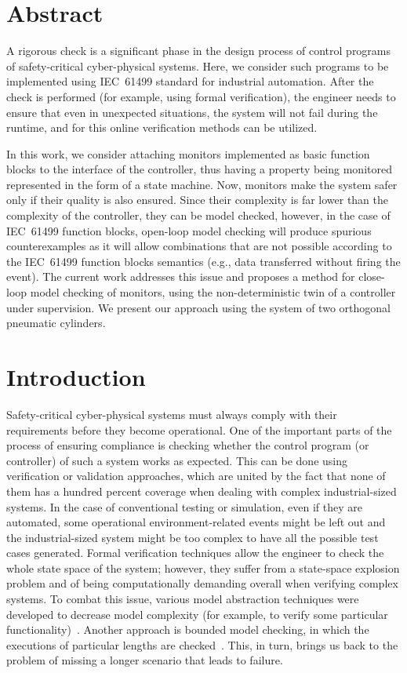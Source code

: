 \begin{bibunit}
\thispagestyle{plain}

\section*{Abstract}
A rigorous check is a significant phase in the design process of control programs of safety-critical cyber-physical systems. Here, we consider such programs to be implemented using IEC~61499 standard for industrial automation. After the check is performed (for example, using formal verification), the engineer needs to ensure that even in unexpected situations, the system will not fail during the runtime, and for this online verification methods can be utilized.

In this work, we consider attaching monitors implemented as basic function blocks to the interface of the controller, thus having a property being monitored represented in the form of a state machine. Now, monitors make the system safer only if their quality is also ensured. Since their complexity is far lower than the complexity of the controller, they can be model checked, however, in the case of IEC~61499 function blocks, open-loop model checking will produce spurious counterexamples as it will allow combinations that are not possible according to the IEC~61499 function blocks semantics (e.g., data transferred without firing the event). The current work addresses this issue and proposes a method for close-loop model checking of monitors, using the non-deterministic twin of a controller under supervision. We present our approach using the system of two orthogonal pneumatic cylinders.

\section{Introduction}
Safety-critical cyber-physical systems must always comply with their requirements before they become operational. One of the important parts of the process of ensuring compliance is checking whether the control program (or controller) of such a system works as expected. This can be done using verification or validation approaches, which are united by the fact that none of them has a hundred percent coverage when dealing with complex industrial-sized systems. In the case of conventional testing or simulation, even if they are automated, some operational environment-related events might be left out and the industrial-sized system might be too complex to have all the possible test cases generated. Formal verification techniques allow the engineer to check the whole state space of the system; however, they suffer from a state-space explosion problem and of being computationally demanding overall when verifying complex systems. To combat this issue, various model abstraction techniques were developed to decrease model complexity (for example, to verify some particular functionality)~\cite{clarke2000,burch1992symbolic}. Another approach is bounded model checking, in which the executions of particular lengths are checked~\cite{biere2003bounded}. This, in turn, brings us back to the problem of missing a longer scenario that leads to failure.


\end{bibunit}
